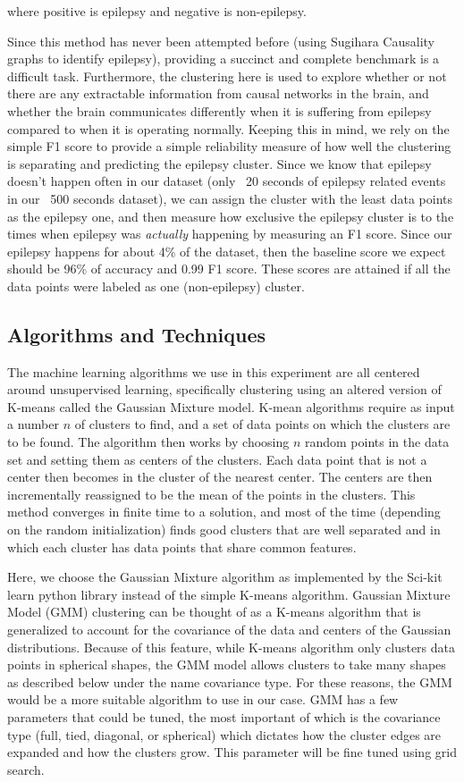 \documentclass[journal,12pt,onecolumn,draftclsnofoot]{IEEEtran}  %
\begin{document}
where positive is epilepsy and negative is non-epilepsy.

Since this method has never been attempted before (using Sugihara Causality graphs to identify epilepsy), providing a succinct and complete benchmark is a difficult task. Furthermore, the clustering here is used to explore whether or not there are any extractable information from causal networks in the brain, and whether the brain communicates differently when it is suffering from epilepsy compared to when it is operating normally. Keeping this in mind, we rely on the simple F1 score to provide a simple reliability measure of how well the clustering is separating and predicting the epilepsy cluster. Since we know that epilepsy doesn't happen often in our dataset (only ~20 seconds  of epilepsy related events in our ~500 seconds dataset), we can assign the cluster with the least data points as the epilepsy one, and then measure how exclusive the epilepsy cluster is to the times when epilepsy was \textit{actually} happening by measuring an F1 score. Since our epilepsy happens for about 4\% of the dataset, then the baseline score we expect should be 96\% of accuracy and 0.99 F1 score. These scores are attained if all the data points were labeled as one (non-epilepsy) cluster.


\subsection{Algorithms and Techniques}
The machine learning algorithms we use in this experiment are all centered around unsupervised learning, specifically clustering using an altered version of K-means called the Gaussian Mixture model. K-mean algorithms require as input a number $n$ of clusters to find, and a set of data points on which the clusters are to be found. The algorithm then works by choosing $n$ random points in the data set and setting them as centers of the clusters. Each data point that is not a center then becomes in the cluster of the nearest center. The centers are then incrementally reassigned to be the mean of the points in the clusters. This method converges in finite time to a solution, and most of the time (depending on the random initialization) finds good clusters that are well separated and in which each cluster has data points that share common features. 

Here, we choose the Gaussian Mixture algorithm as implemented by the Sci-kit learn python library instead of the simple K-means algorithm. Gaussian Mixture Model (GMM) clustering can be thought of as a K-means algorithm that is generalized to account for the covariance of the data and centers of the Gaussian distributions. Because of this feature, while K-means algorithm only clusters data points in spherical shapes, the GMM model allows clusters to take many shapes as described below under the name covariance type. For these reasons, the GMM would be a more suitable algorithm to use in our case. GMM has a few parameters that could be tuned, the most important of which is the covariance type (full, tied, diagonal, or spherical) which dictates how the cluster edges are expanded and how the clusters grow. This parameter will be fine tuned using grid search. 
\end{document}
